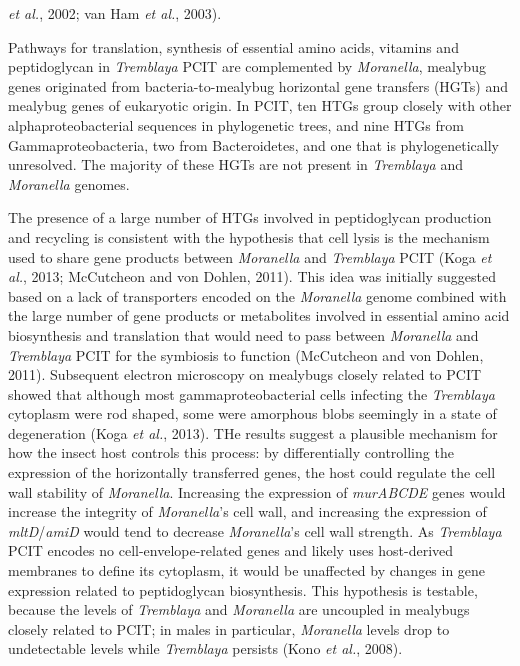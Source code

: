 \documentclass[11pt]{article}
\begin{document}
\begin{sloppypar}
\textit{et al.}, 2002; van Ham \textit{et al.}, 2003). 
\par
Pathways for translation, synthesis of essential amino acids, vitamins and peptidoglycan in \textit{Tremblaya} PCIT are complemented by \textit{Moranella}, mealybug genes originated from bacteria-to-mealybug horizontal gene transfers (HGTs) and mealybug genes of eukaryotic origin. 
In PCIT, ten HTGs group closely with other alphaproteobacterial sequences in phylogenetic trees, and nine HTGs from Gammaproteobacteria, two from Bacteroidetes, and one that is phylogenetically unresolved. 
The majority of these HGTs are not present in \textit{Tremblaya} and \textit{Moranella} genomes. 
\par
The presence of a large number of HTGs involved in peptidoglycan production and recycling is consistent with the hypothesis that cell lysis is the mechanism used to share gene products between \textit{Moranella} and \textit{Tremblaya} PCIT (Koga \textit{et al.}, 2013; McCutcheon and von Dohlen, 2011). 
This idea was initially suggested based on a lack of transporters encoded on the \textit{Moranella} genome combined with the large number of gene products or metabolites involved in essential amino acid biosynthesis and translation that would need to pass between \textit{Moranella} and \textit{Tremblaya} PCIT for the symbiosis to function (McCutcheon and von Dohlen, 2011). 
Subsequent electron microscopy on mealybugs closely related to PCIT showed that although most gammaproteobacterial cells infecting the \textit{Tremblaya} cytoplasm were rod shaped, some were amorphous blobs seemingly in a state of degeneration (Koga \textit{et al.}, 2013).
THe results suggest a plausible mechanism for how the insect host controls this process: by differentially controlling the
expression of the horizontally transferred genes, the host could regulate the cell wall stability of \textit{Moranella}. Increasing the expression of \textit{murABCDE} genes would increase the integrity of \textit{Moranella}’s cell wall, and increasing the expression of \textit{mltD}/\textit{amiD} would tend to decrease \textit{Moranella}’s cell wall strength. 
As \textit{Tremblaya} PCIT encodes no cell-envelope-related genes and likely uses host-derived membranes to define its cytoplasm, it would be unaffected by changes in gene expression related to peptidoglycan biosynthesis. 
This hypothesis is testable, because the levels of \textit{Tremblaya} and \textit{Moranella} are uncoupled in mealybugs closely related to PCIT; in males in particular, \textit{Moranella} levels drop to undetectable levels while \textit{Tremblaya} persists (Kono \textit{et al.}, 2008). \

\end{sloppypar}
\end{document}

